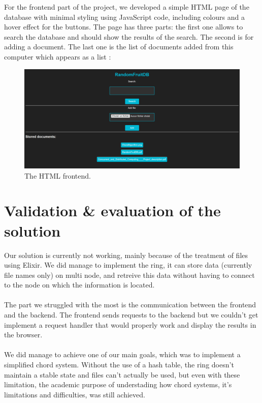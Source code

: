 \documentclass{article}
\begin{document}
For the frontend part of the project, we developed a simple HTML page of the database with minimal styling using JavaScript code, including colours and a hover effect for the buttons. 
The page has three parts: the first one allows to search the database and should show the results of the search. The second is for adding a document. The last one is the list of documents added from this computer which appears as a list :

\begin{figure}[!htbp]
  \centering
  \includegraphics[width=\textwidth]{img/html.png}
  \caption{The HTML frontend.}
  \label{figure 3 :}
\end{figure}


\section{Validation \& evaluation of the solution}

Our solution is currently not working, mainly because of the treatment of files using Elixir. We did manage to implement the ring, it can store data (currently file names only) on multi node, and retreive this data without having to connect to the node on which the information is located. 
\\\\
The part we struggled with the most is the communication between the frontend and the backend. The frontend sends requests to the backend but we couldn't get implement a request handler that would properly work and display the results in the browser.
\\\\
We did manage to achieve one of our main goals, which was to implement a simplified chord system. Without the use of a hash table, the ring doesn't maintain a stable state and files can't actually be used, but even with these limitation, the academic purpose of understading how chord systems, it's limitations and difficulties, was still achieved.
\end{document}
